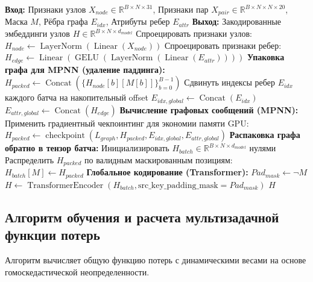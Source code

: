 \documentclass[12pt, a4paper]{article}
\begin{document}
\begin{algorithm}[h]
\caption{Прямой проход гибридного кодировщика}
\label{alg:encoder}
\begin{algorithmic}[1]
\Statex \textbf{Вход:} Признаки узлов $X_{node} \in \mathbb{R}^{B \times N \times 31}$, Признаки пар $X_{pair} \in \mathbb{R}^{B \times N \times N \times 20}$, Маска $M$, Рёбра графа $E_{idx}$, Атрибуты ребер $E_{attr}$
\Statex \textbf{Выход:} Закодированные эмбеддинги узлов $H \in \mathbb{R}^{B \times N \times d_{model}}$
\State Спроецировать признаки узлов: $H_{node} \gets \operatorname{LayerNorm}(\operatorname{Linear}(X_{node}))$
\State Спроецировать признаки ребер: $H_{edge} \gets \operatorname{Linear}(\operatorname{GELU}(\operatorname{LayerNorm}(\operatorname{Linear}(E_{attr}))))$
\State \textbf{Упаковка графа для MPNN (удаление паддинга):}
\State \quad $H_{packed} \gets \operatorname{Concat}(\{ H_{node}[b][M[b]] \}_{b=0}^{B-1})$
\State \quad Сдвинуть индексы ребер $E_{idx}$ каждого батча на накопительный offset
\State \quad $E_{idx, global} \gets \operatorname{Concat}(E_{idx})$
\State \quad $E_{attr, global} \gets \operatorname{Concat}(H_{edge})$
\State \textbf{Вычисление графовых сообщений (MPNN):}
    \State Применить градиентный чекпоинтинг для экономии памяти GPU:
    \State $H_{packed} \gets \operatorname{checkpoint}(L_{graph}, H_{packed}, E_{idx, global}, E_{attr, global})$
\EndFor
\State \textbf{Распаковка графа обратно в тензор батча:}
\State \quad Инициализировать $H_{batch} \in \mathbb{R}^{B \times N \times d_{model}}$ нулями
\State \quad Распределить $H_{packed}$ по валидным маскированным позициям: $H_{batch}[M] \gets H_{packed}$
\State \textbf{Глобальное кодирование (Transformer):}
\State \quad $Pad_{mask} \gets \neg M$
\State \quad $H \gets \operatorname{TransformerEncoder}(H_{batch}, \text{src\_key\_padding\_mask}=Pad_{mask})$
\State \Return $H$
\end{algorithmic}
\end{algorithm}

\newpage

\subsection{Алгоритм обучения и расчета мультизадачной функции потерь}
Алгоритм вычисляет общую функцию потерь с динамическими весами на основе гомоскедастической неопределенности.
\end{document}
